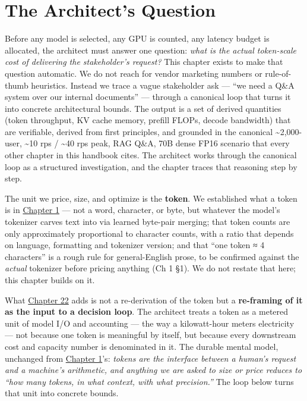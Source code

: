 \section*{The Architect's Question}\label{the-architects-question}

Before any model is selected, any GPU is counted, any latency budget is
allocated, the architect must answer one question: \emph{what is the
actual token-scale cost of delivering the stakeholder's request?} This
chapter exists to make that question automatic. We do not reach for
vendor marketing numbers or rule-of-thumb heuristics. Instead we trace a
vague stakeholder ask --- ``we need a Q\&A system over our internal
documents'' --- through a canonical loop that turns it into concrete
architectural bounds. The output is a set of derived quantities (token
throughput, KV cache memory, prefill FLOPs, decode bandwidth) that are
verifiable, derived from first principles, and grounded in the canonical
\textasciitilde2,000-user, \textasciitilde10 rps / \textasciitilde40 rps
peak, RAG Q\&A, 70B dense FP16 scenario that every other chapter in this
handbook cites. The architect works through the canonical loop as a
structured investigation, and the chapter traces that reasoning step by
step.

\label{concept}


The unit we price, size, and optimize is the \textbf{token}. We
established what a token is in \hyperref[chap:1]{Chapter 1} --- not a word, character, or
byte, but whatever the model's tokenizer carves text into via learned
byte-pair merging; that token counts are only approximately proportional
to character counts, with a ratio that depends on language, formatting
and tokenizer version; and that ``one token ≈ 4 characters'' is a rough
rule for general-English prose, to be confirmed against the
\emph{actual} tokenizer before pricing anything (Ch 1 §1). We do not
restate that here; this chapter builds on it.

What \hyperref[chap:22]{Chapter 22} adds is not a re-derivation of the token but a
\textbf{re-framing of it as the input to a decision loop}. The architect
treats a token as a metered unit of model I/O and accounting --- the way
a kilowatt-hour meters electricity --- not because one token is
meaningful by itself, but because every downstream cost and capacity
number is denominated in it. The durable mental model, unchanged from
\hyperref[chap:1]{Chapter 1}'s: \emph{tokens are the interface between a human's request
and a machine's arithmetic, and anything we are asked to size or price
reduces to ``how many tokens, in what context, with what precision.''}
The loop below turns that unit into concrete bounds.

